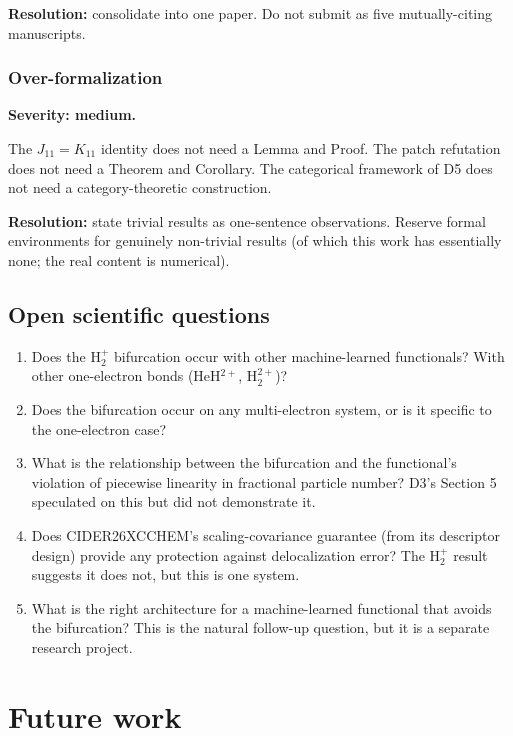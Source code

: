 \documentclass[11pt]{report}
\theoremstyle{definition}
\theoremstyle{remark}
\begin{document}
\textbf{Resolution:} consolidate into one paper. Do not submit as five
mutually-citing manuscripts.

\subsection{Over-formalization}

\textbf{Severity: medium.}

The $J_{11} = K_{11}$ identity does not need a Lemma and Proof. The patch
refutation does not need a Theorem and Corollary. The categorical framework
of D5 does not need a category-theoretic construction.

\textbf{Resolution:} state trivial results as one-sentence observations.
Reserve formal environments for genuinely non-trivial results (of which
this work has essentially none; the real content is numerical).

\section{Open scientific questions}

\begin{enumerate}
  \item Does the H$_2^+$ bifurcation occur with other machine-learned
        functionals? With other one-electron bonds (HeH$^{2+}$,
        H$_2^{2+}$)?
  \item Does the bifurcation occur on any multi-electron system, or is
        it specific to the one-electron case?
  \item What is the relationship between the bifurcation and the
        functional's violation of piecewise linearity in fractional
        particle number? D3's Section 5 speculated on this but did not
        demonstrate it.
  \item Does CIDER26XCCHEM's scaling-covariance guarantee (from its
        descriptor design) provide any protection against
        delocalization error? The H$_2^+$ result suggests it does not,
        but this is one system.
  \item What is the right architecture for a machine-learned functional
        that avoids the bifurcation? This is the natural follow-up
        question, but it is a separate research project.
\end{enumerate}

\chapter{Future work}
\label{ch:future}
\end{document}
